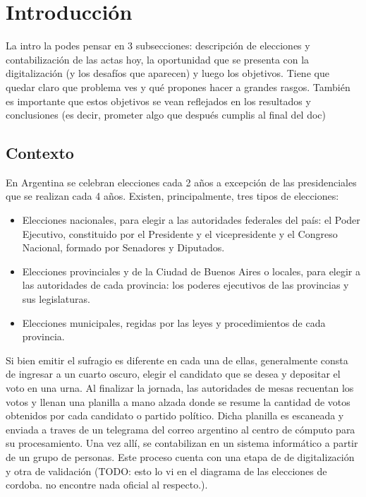 \chapter{Introducci\'on}

\label{Chapter1}

La intro la podes pensar en 3 subsecciones: descripción de elecciones y contabilización de las actas hoy, la
oportunidad que se presenta con la digitalización (y los desafíos que aparecen) y luego los objetivos. Tiene que quedar
claro que problema ves y qué propones hacer a grandes rasgos. También es importante que estos objetivos se vean
reflejados en los resultados y conclusiones (es decir, prometer algo que después cumplis al final del doc)

\section{Contexto}

En Argentina se celebran elecciones cada 2 a\~{n}os a excepci\'on de las presidenciales que se realizan cada 4
a\~{n}os. Existen, principalmente, tres tipos de elecciones:

\begin{itemize}
    \item Elecciones nacionales, para elegir a las autoridades federales del país: el Poder Ejecutivo, constituido por el
          Presidente y el vicepresidente y el Congreso Nacional, formado por Senadores y Diputados.
    \item Elecciones provinciales y de la Ciudad de Buenos Aires o locales, para elegir a las autoridades de cada provincia: los
          poderes ejecutivos de las provincias y sus legislaturas.
    \item Elecciones municipales, regidas por las leyes y procedimientos de cada provincia.
\end{itemize}

Si bien emitir el sufragio es diferente en cada una de ellas, generalmente consta de ingresar a un cuarto oscuro,
elegir el candidato que se desea y depositar el voto en una urna. Al finalizar la jornada, las autoridades de mesas
recuentan los votos y llenan una planilla a mano alzada donde se resume la cantidad de votos obtenidos por cada
candidato o partido pol\'itico. Dicha planilla es escaneada y enviada a traves de un telegrama del correo argentino al
centro de c\'omputo para su procesamiento. Una vez all\'i, se contabilizan en un sistema inform\'atico a partir de un
grupo de personas. Este proceso cuenta con una etapa de de digitalizaci\'on y otra de validaci\'on (TODO: esto lo vi en
el diagrama de las elecciones de cordoba. no encontre nada oficial al respecto.).

